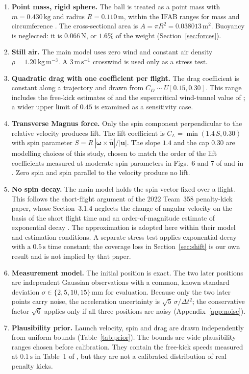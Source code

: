 \documentclass[11pt,a4paper]{article}
\begin{document}
\begin{enumerate}
  \item[\textbf{A1.}] \textbf{Point mass, rigid sphere.} The ball is treated as a point mass with $m=0.430\,\mathrm{kg}$ and radius $R=0.110\,\mathrm{m}$, within the IFAB ranges for mass and circumference \cite{ifab}. The cross-sectional area is $A=\pi R^2=0.038013\,\mathrm{m^2}$. Buoyancy is neglected: it is $0.066\,\mathrm{N}$, or $1.6\%$ of the weight (Section~\ref{sec:forces}).
  \item[\textbf{A2.}] \textbf{Still air.} The main model uses zero wind and constant air density $\rho=1.20\,\mathrm{kg\,m^{-3}}$. A $3\,\mathrm{m\,s^{-1}}$ crosswind is used only as a stress test.
  \item[\textbf{A3.}] \textbf{Quadratic drag with one coefficient per flight.} The drag coefficient is constant along a trajectory and drawn from $C_D\sim U[0.15,0.30]$. This range includes the free-kick estimates of \cite{bray2003} and the supercritical wind-tunnel value of \cite{asai2007}; a wider upper limit of $0.45$ is examined as a sensitivity case.
  \item[\textbf{A4.}] \textbf{Transverse Magnus force.} Only the spin component perpendicular to the relative velocity produces lift. The lift coefficient is $C_L=\min(1.4\,S,0.30)$ with spin parameter $S=R\,|\boldsymbol{\omega}\times\hat{\mathbf{u}}|/|\mathbf{u}|$. The slope $1.4$ and the cap $0.30$ are modelling choices of this study, chosen to match the order of the lift coefficients measured at moderate spin parameters in Figs.~6 and 7 of \cite{goff2010} and in \cite{asai2007}. Zero spin and spin parallel to the velocity produce no lift.
  \item[\textbf{A5.}] \textbf{No spin decay.} The main model holds the spin vector fixed over a flight. This follows the short-flight argument of the 2022 Team~358 penalty-kick paper, whose Section~3.1.4 neglects the change of angular velocity on the basis of the short flight time and an order-of-magnitude estimate of exponential decay \cite{team358}. The approximation is adopted here within their model and estimation conditions. A separate stress test applies exponential decay with a $0.5\,\mathrm{s}$ time constant; the coverage loss in Section~\ref{sec:shift} is our own result and is not implied by that paper.
  \item[\textbf{A6.}] \textbf{Measurement model.} The initial position is exact. The two later positions are independent Gaussian observations with a common, known standard deviation $\sigma\in\{2,5,10,15\}\,\mathrm{mm}$ for evaluation. Because only the two later points carry noise, the acceleration uncertainty is $\sqrt{5}\,\sigma/\Delta t^2$; the conservative factor $\sqrt{6}$ applies only if all three positions are noisy (Appendix~\ref{app:noise}).
  \item[\textbf{A7.}] \textbf{Plausibility prior.} Launch velocity, spin and drag are drawn independently from uniform bounds (Table~\ref{tab:prior}). The bounds are wide plausibility ranges chosen before calibration. They contain the free-kick speeds measured at $0.1\,\mathrm{s}$ in Table~1 of \cite{bray2003}, but they are not a calibrated distribution of real penalty kicks.
\end{enumerate}
\end{document}
